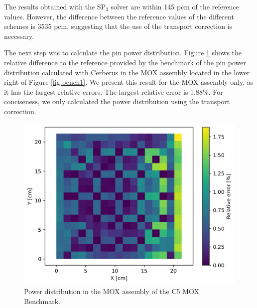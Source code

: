 \documentclass{anstrans}
\begin{document}
The results obtained with the SP$_3$ solver are within 145 pcm of the reference values.
However, the difference between the reference values of the different schemes is 3535 pcm, suggesting that the use of the transport correction is necessary.

The next step was to calculate the pin power distribution.
Figure \ref{fig:power-pbp} shows the relative difference to the reference provided by the benchmark \cite{cavarec_benchmark_1994} of the pin power distribution calculated with Cerberus in the MOX assembly located in the lower right of Figure \ref{fig:bench1}.
We present this result for the MOX assembly only, as it has the largest relative errors.
The largest relative error is 1.88\%.
For conciseness, we only calculated the power distribution using the transport correction.

\begin{figure}[h] %
    \centering
    \includegraphics[width=0.75\linewidth]{figures/mox-r-pin-by-pin.png}
    \hfill
    \caption{Power distribution in the MOX assembly of the C5 MOX Benchmark.}
    \label{fig:power-pbp}
\end{figure}



\end{document}
